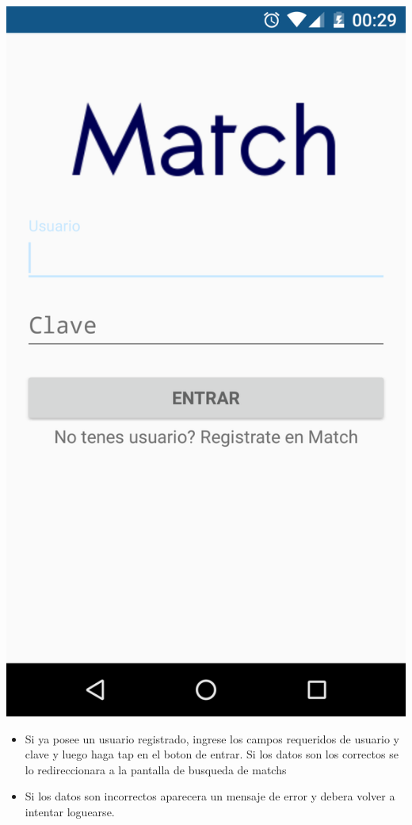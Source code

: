 \documentclass[letterpaper,10pt,english]{sphinxmanual}
\begin{document}
\includegraphics{login.png}
\begin{itemize}
\item {} 
Si ya posee un usuario registrado, ingrese los campos requeridos de usuario y clave y luego haga tap en el boton de entrar. Si los datos son los correctos se lo redireccionara a la pantalla de busqueda de matchs

\item {} 
Si los datos son incorrectos aparecera un mensaje de error y debera volver a intentar loguearse.

\end{itemize}
\end{document}
